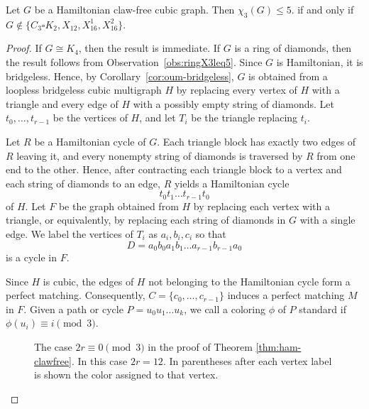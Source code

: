 \begin{theorem}\label{thm:ham-clawfree}
Let $G$ be a Hamiltonian claw-free cubic graph. 
Then
$
\chi_3(G)\leq5.
$
if and only if
$
G\notin\{C_3\square K_2,X_{12},X_{16}^{1},X_{16}^{2}\}.
$
\end{theorem}
\begin{proof}
If $G\cong K_4$, then the result is immediate. If $G$ is a ring of
diamonds, then the result follows from
Observation~\ref{obs:ringX3leq5}. Since $G$ is Hamiltonian, it is
bridgeless. Hence, by
Corollary~\ref{cor:oum-bridgeless}, $G$ is obtained from a loopless
bridgeless cubic multigraph $H$ by replacing every vertex of $H$ with
a triangle and every edge of $H$ with a possibly empty string of diamonds.
Let $t_0,\ldots,t_{r-1}$ be the vertices of $H$, and let $T_i$ be the
triangle replacing $t_i$.

Let $R$ be a Hamiltonian cycle of $G$. Each triangle block has exactly
two edges of $R$ leaving it, and every nonempty string of diamonds is
traversed by $R$ from one end to the other. Hence, after contracting
each triangle block to a vertex and each string of diamonds to an edge,
$R$ yields a Hamiltonian cycle
\[
t_0t_1\ldots t_{r-1}t_0
\]
of $H$.
Let $F$ be the graph obtained from $H$ by replacing each vertex with a
triangle, or equivalently, by replacing each string of diamonds in $G$
with a single edge. We label the vertices of $T_i$ as
$a_i,b_i,c_i$ so that
\[
D=a_0b_0a_1b_1\ldots a_{r-1}b_{r-1}a_0
\]
is a cycle in $F$.

Since $H$ is cubic, the edges of $H$ not belonging to the Hamiltonian
cycle form a perfect matching. Consequently,
$C=\{c_0,\ldots,c_{r-1}\}$ induces a perfect matching $M$ in $F$.
Given a path or cycle $P=u_0u_1\ldots u_k$, we call a coloring $\phi$
of $P$ standard if
$
\phi(u_i)\equiv i \pmod 3.
$

\begin{figure}[H]
    \centering

    

    \caption{The case $2r\equiv0\pmod3$ in the proof of
    Theorem \ref{thm:ham-clawfree}. In this case $2r=12$.
    In parentheses after each vertex label is shown the color
    assigned to that vertex.}
    \label{fig:2requiv0mod3}
\end{figure}


\end{proof}
